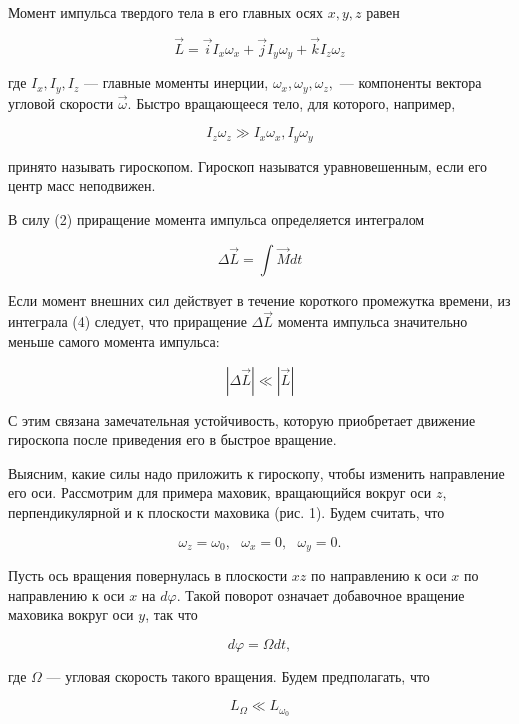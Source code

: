 \documentclass[14pt]{article}
\begin{document}
Момент импульса твердого тела в его главных осях $x, y, z$ равен

\begin{equation}
\vec{L} = \vec{i}I_x\omega_x + \vec{j}I_y\omega_y + \vec{k}I_z\omega_z
\end{equation}

\noindent где $I_x, I_y, I_z$ --- главные моменты инерции, $\omega_x, \omega_y, \omega_z,$ --- компоненты вектора угловой скорости 
$\vec{\omega}$. Быстро вращающееся тело, для которого, например,

$$I_z\omega_z \gg I_x\omega_x, I_y\omega_y$$

\noindent принято называть гироскопом. Гироскоп называтся уравновешенным, если его центр масс неподвижен.

В силу (2) приращение момента импульса определяется интегралом

\begin{equation}
\Delta \vec{L} = \int\vec{M}dt
\end{equation}

\noindent Если момент внешних сил действует в течение короткого промежутка времени, из интеграла (4) следует, что приращение $\Delta\vec{L}$ момента импульса значительно меньше самого момента импульса:

\begin{equation}
|\Delta\vec{L}| \ll |\vec{L}|
\end{equation}

\noindent С этим связана замечательная устойчивость, которую приобретает движение гироскопа после приведения его в быстрое вращение.

Выясним, какие силы надо приложить к гироскопу, чтобы изменить направление его оси. Рассмотрим для примера маховик, вращающийся вокруг оси $z$, перпендикулярной и к плоскости маховика (рис. 1). Будем считать, что

$$\omega_z = \omega_0, ~~~\omega_x = 0, ~~~\omega_y = 0.$$

\noindent Пусть ось вращения повернулась в плоскости $xz$ по направлению к оси $x$ по направлению к оси $x$ на $d\varphi$. Такой поворот означает добавочное вращение маховика вокруг оси $y$, так что 

$$d\varphi = \Omega dt,$$

\noindent где $\Omega$ --- угловая скорость такого вращения. Будем предполагать, что 

\begin{equation}
L_{\Omega} \ll L_{\omega_0}
\end{equation}
\end{document}
